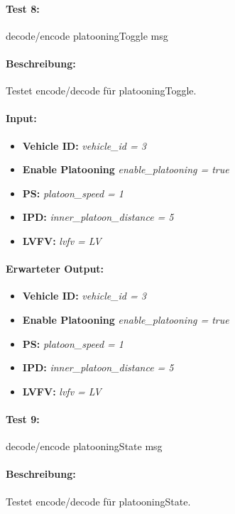 \documentclass[a4paper, 12pt, titlepage]{scrartcl}
\begin{document}
{			\paragraph{Test 8:}{decode/encode platooningToggle msg}
			\paragraph{Beschreibung:} Testet encode/decode für platooningToggle.
			\paragraph{Input:}
			\begin{itemize} \itemsep-0.5em
				\item \textbf{Vehicle ID:} \emph{vehicle\_id = 3}
				\item \textbf{Enable Platooning} \emph{enable\_platooning = true}
				\item \textbf{PS:} \emph{platoon\_speed = 1}
				\item \textbf{IPD:} \emph{inner\_platoon\_distance = 5}
				\item \textbf{LVFV:} \emph{lvfv = LV}
			\end{itemize}
			\paragraph{Erwarteter Output:}
			\begin{itemize} \itemsep-0.5em
				\item \textbf{Vehicle ID:} \emph{vehicle\_id = 3}
				\item \textbf{Enable Platooning} \emph{enable\_platooning = true}
				\item \textbf{PS:} \emph{platoon\_speed = 1}
				\item \textbf{IPD:} \emph{inner\_platoon\_distance = 5}
				\item \textbf{LVFV:} \emph{lvfv = LV}
			\end{itemize}			
	
			\paragraph{Test 9:}{decode/encode platooningState msg}
			\paragraph{Beschreibung:} Testet encode/decode für platooningState.
}
\end{document}
